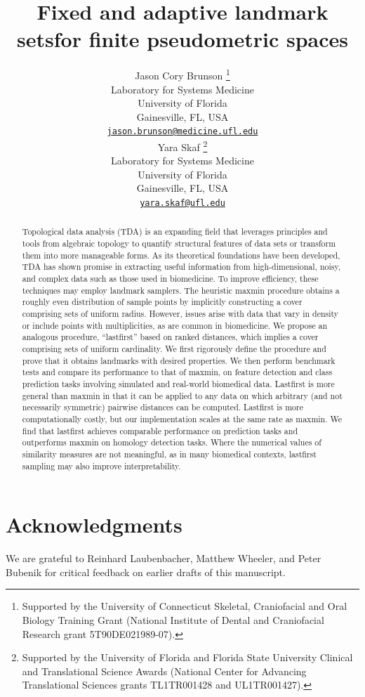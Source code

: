 \documentclass{article}
\title{Fixed and adaptive landmark sets\linebreak for finite
pseudometric spaces}
\author{
    Jason Cory Brunson
    \thanks{Supported by the University of Connecticut Skeletal,
Craniofacial and Oral Biology Training Grant (National Institute of
Dental and Craniofacial Research grant 5T90DE021989-07).}
   \\
    Laboratory for Systems Medicine \\
    University of Florida \\
  Gainesville, FL, USA \\
  \texttt{\href{mailto:jason.brunson@medicine.ufl.edu}{\nolinkurl{jason.brunson@medicine.ufl.edu}}} \\
   \And
    Yara Skaf
    \thanks{Supported by the University of Florida and Florida State
University Clinical and Translational Science Awards (National Center
for Advancing Translational Sciences grants TL1TR001428 and
UL1TR001427).}
   \\
    Laboratory for Systems Medicine \\
    University of Florida \\
  Gainesville, FL, USA \\
  \texttt{\href{mailto:yara.skaf@ufl.edu}{\nolinkurl{yara.skaf@ufl.edu}}} \\
  }
\begin{document}
\maketitle


\begin{abstract}
Topological data analysis (TDA) is an expanding field that leverages
principles and tools from algebraic topology to quantify structural
features of data sets or transform them into more manageable forms. As
its theoretical foundations have been developed, TDA has shown promise
in extracting useful information from high-dimensional, noisy, and
complex data such as those used in biomedicine. To improve efficiency,
these techniques may employ landmark samplers. The heuristic maxmin
procedure obtains a roughly even distribution of sample points by
implicitly constructing a cover comprising sets of uniform radius.
However, issues arise with data that vary in density or include points
with multiplicities, as are common in biomedicine. We propose an
analogous procedure, ``lastfirst'' based on ranked distances, which
implies a cover comprising sets of uniform cardinality. We first
rigorously define the procedure and prove that it obtains landmarks with
desired properties. We then perform benchmark tests and compare its
performance to that of maxmin, on feature detection and class prediction
tasks involving simulated and real-world biomedical data. Lastfirst is
more general than maxmin in that it can be applied to any data on which
arbitrary (and not necessarily symmetric) pairwise distances can be
computed. Lastfirst is more computationally costly, but our
implementation scales at the same rate as maxmin. We find that lastfirst
achieves comparable performance on prediction tasks and outperforms
maxmin on homology detection tasks. Where the numerical values of
similarity measures are not meaningful, as in many biomedical contexts,
lastfirst sampling may also improve interpretability.
\end{abstract}


\hypertarget{acknowledgments}{%
\section*{Acknowledgments}\label{acknowledgments}}

We are grateful to Reinhard Laubenbacher, Matthew Wheeler, and Peter
Bubenik for critical feedback on earlier drafts of this manuscript.
\end{document}
